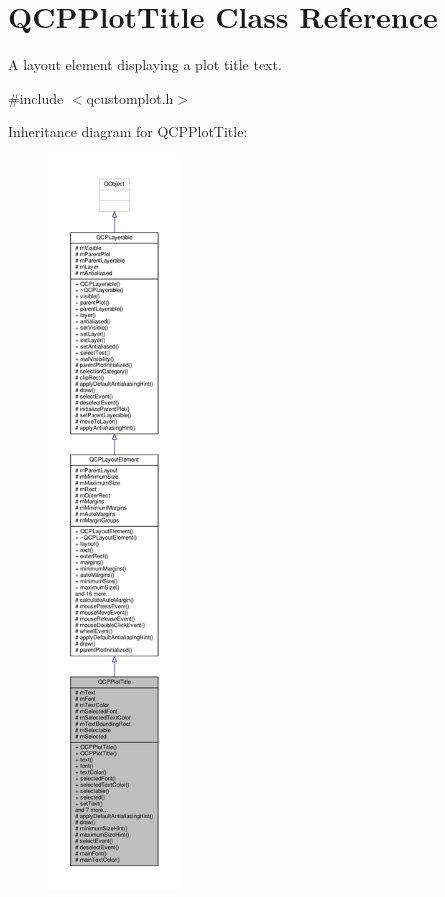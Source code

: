 \hypertarget{class_q_c_p_plot_title}{}\section{Q\+C\+P\+Plot\+Title Class Reference}
\label{class_q_c_p_plot_title}


A layout element displaying a plot title text.  




{\ttfamily \#include $<$qcustomplot.\+h$>$}



Inheritance diagram for Q\+C\+P\+Plot\+Title\+:\nopagebreak
\begin{figure}[H]
\begin{center}
\leavevmode
\includegraphics[height=550pt]{class_q_c_p_plot_title__inherit__graph}
\end{center}
\end{figure}


